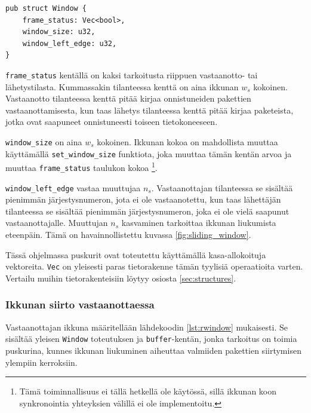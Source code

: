 \documentclass[a4paper,12pt]{article}
\begin{document}
    
\begin{lstlisting}[caption={Ikkunan rakenne}, label={lst:window}]
pub struct Window {
    frame_status: Vec<bool>,
    window_size: u32,
    window_left_edge: u32,
}\end{lstlisting}

\lstinline{frame_status} kentällä on kaksi tarkoitusta riippuen vastaanotto- tai lähetystilasta. Kummassakin tilanteessa kenttä on aina ikkunan $w_s$ kokoinen. Vastaanotto tilanteessa kenttä pitää kirjaa onnistuneiden pakettien vastaanottamisesta, kun taas lähetys tilanteessa kenttä pitää kirjaa paketeista, jotka ovat saapuneet onnistuneesti toiseen tietokoneeseen. \par

\lstinline{window_size} on aina $w_s$ kokoinen. Ikkunan kokoa on mahdollista muuttaa käyttämällä \lstinline{set_window_size} funktiota, joka muuttaa tämän kentän arvoa ja muuttaa \lstinline{frame_status} taulukon kokoa \footnote{Tämä toiminnallisuus ei tällä hetkellä ole käytössä, sillä ikkunan koon synkronointia yhteyksien välillä ei ole implementoitu.}.\par

\lstinline{window_left_edge} vastaa muuttujaa $n_s$. Vastaanottajan tilanteessa se sisältää pienimmän järjestysnumeron, jota ei ole vastaanotettu, kun taas lähettäjän tilanteessa se sisältää pienimmän järjestysnumeron, joka ei ole vielä saapunut vastaanottajalle. Muuttujan $n_s$ kasvaminen tarkoittaa ikkunan liukumista eteenpäin. Tämä on havainnollistettu kuvassa \ref{fig:sliding_window}. 

    \slidingWindow
    
    Tässä ohjelmassa puskurit ovat toteutettu käyttämällä kasa-allokoituja vektoreita. \lstinline{Vec} on yleisesti paras tietorakenne tämän tyylisiä operaatioita varten. Vertailu muihin tietorakenteisiin löytyy osiosta \ref{sec:structures}.

\newpage

    \subsubsection{Ikkunan siirto vastaanottaessa}




    Vastaanottajan ikkuna määritellään lähdekoodin \ref{lst:rwindow} mukaisesti. Se sisältää yleisen \lstinline{Window} toteutuksen ja \lstinline{buffer}-kentän, jonka tarkoitus on toimia puskurina, kunnes ikkunan liukuminen aiheuttaa valmiiden pakettien siirtymisen ylempiin kerroksiin. \par
    
\end{document}
